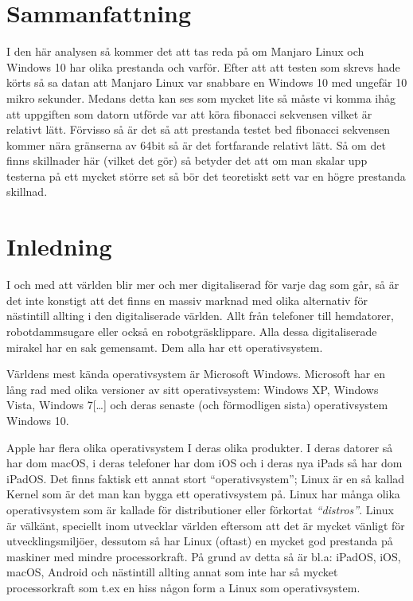 \documentclass[12pt, a4paper]{report}
\begin{document}
\section{Sammanfattning}\label{sum}

I den här analysen så kommer det att tas reda på om Manjaro Linux och Windows 10 har olika prestanda och varför. Efter att att testen som skrevs hade körts så sa datan att Manjaro Linux var snabbare en Windows 10 med ungefär 10 mikro sekunder. Medans detta kan ses som mycket lite så måste vi komma ihåg att uppgiften som datorn utförde var att köra fibonacci sekvensen vilket är relativt lätt. Förvisso så är det så att prestanda testet bed fibonacci sekvensen kommer nära gränserna av 64bit så är det fortfarande relativt lätt. Så om det finns skillnader här (vilket det gör) så betyder det att om man skalar upp testerna på ett mycket större set så bör det teoretiskt sett var en högre prestanda skillnad. 


\vspace{1cm}

    
\section{Inledning}
 
 
   I och med att världen blir mer och mer digitaliserad för varje dag som går, så är det inte konstigt att det finns en massiv marknad med olika alternativ för nästintill allting i den digitaliserade världen. Allt från telefoner till hemdatorer, robotdammsugare eller också en robotgräsklippare. Alla dessa digitaliserade mirakel har en sak gemensamt. Dem alla har ett operativsystem.
 
   Världens mest kända operativsystem\cite{winstat} är Microsoft Windows. Microsoft har en lång rad med olika versioner av sitt operativsystem\cite{windows}: Windows XP, Windows Vista, Windows 7[\dots] och deras senaste (och förmodligen sista) operativsystem Windows 10.
    
   Apple har flera olika operativsystem I deras olika produkter. I deras datorer så har dom macOS, i deras telefoner har dom iOS och i deras nya iPads så har dom iPadOS.\cite{appleOS}
    Det finns faktisk ett annat stort ``operativsystem''; Linux är en så kallad Kernel \cite{redhat} som är det man kan bygga ett operativsystem på. Linux har många olika operativsystem som är kallade för distributioner eller förkortat \textit{``distros''}. Linux är välkänt, speciellt inom utvecklar världen eftersom att det är mycket vänligt för utvecklingsmiljöer, dessutom så har Linux (oftast) en mycket god prestanda på maskiner med mindre processorkraft\cite{whatislinux}. På grund av detta så är bl.a: iPadOS, iOS, macOS, Android och nästintill allting annat som inte har så mycket processorkraft som t.ex en hiss någon form a Linux som operativsystem.
\end{document}
